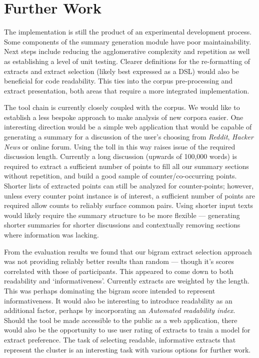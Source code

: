   \section{Further Work}
    The implementation is still the product of an experimental development process. Some components of the summary generation module have poor maintainability. Next steps include reducing the agglomerative complexity and repetition as well as establishing a level of unit testing. Clearer definitions for the re-formatting of extracts and extract selection (likely best expressed as a DSL) would also be beneficial for code readability. This ties into the corpus pre-processing and extract presentation, both areas that require a more integrated implementation.

    The tool chain is currently closely coupled with the corpus. We would like to establish a less bespoke approach to make analysis of new corpora easier. One interesting direction would be a simple web application that would be capable of generating a summary for a discussion of the user's choosing from \textit{Reddit}, \textit{Hacker News} or online forum. Using the toll in this way raises issue of the required discussion length. Currently a long discussion (upwards of 100,000 words) is required to extract a sufficient number of points to fill all our summary sections without repetition, and build a good sample of counter/co-occurring points. Shorter lists of extracted points can still be analyzed for counter-points; however, unless every counter point instance is of interest, a sufficient number of points are required allow counts to reliably surface common pairs. Using shorter input texts would likely require the summary structure to be more flexible --- generating shorter summaries for shorter discussions and contextually removing sections where information was lacking.

    From the evaluation results we found that our bigram extract selection approach was not providing reliably better results than random --- though it's scores correlated with those of participants. This appeared to come down to both readability and `informativeness'. Currently extracts are weighted by the length. This was perhaps dominating the bigram score intended to represent informativeness. It would also be interesting to introduce readability as an additional factor, perhaps by incorporating an \textit{Automated readability index}. Should the tool be made accessible to the public as a web application, there would also be the opportunity to use user rating of extracts to train a model for extract preference. The task of selecting readable, informative extracts that represent the cluster is an interesting task with various options for further work.

